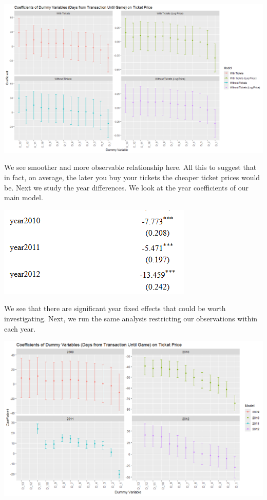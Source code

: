 \documentclass[
  12pt]{article}
\begin{document}
\includegraphics{images/13.png}

We see smoother and more observable relationship here. All this to
suggest that in fact, on average, the later you buy your tickets the
cheaper ticket prices would be. Next we study the year differences. We
look at the year coefficients of our main model.

\includegraphics{images/14.png}

We see that there are significant year fixed effects that could be worth
investigating. Next, we run the same analysis restricting our
observations within each year.

\includegraphics{images/15.png}
\end{document}
